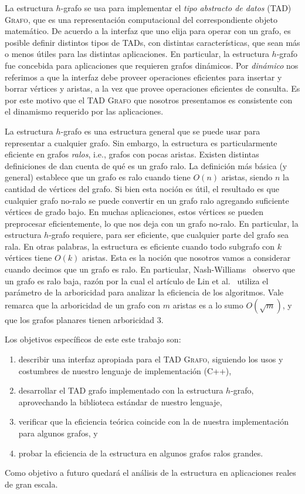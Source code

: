 \documentclass[%
    a4paper,%
    12pt,%
    twoside,%
    openright,%
    halfparskip,%
    cleardoubleempty,%
    bigheadings,%
    titlepage,%
    headsepline%
]{scrbook}
\newcommand{\Grafo}{\textsc{Grafo}\xspace}
\begin{document}
La estructura $h$-grafo se usa para implementar el \emph{tipo abstracto de datos} (TAD) \Grafo, que es una representación computacional del correspondiente objeto matemático.  De acuerdo a la interfaz que uno elija para operar con un grafo, es posible definir distintos tipos de TADs, con distintas características, que sean más o menos útiles para las distintas aplicaciones.  En particular, la estructura $h$-grafo fue concebida para aplicaciones que requieren grafos dinámicos.  Por \emph{dinámico} nos referimos a que la interfaz debe proveer operaciones eficientes para insertar y borrar vértices y aristas, a la vez que provee operaciones eficientes de consulta.  Es por este motivo que el TAD \Grafo que nosotros presentamos es consistente con el dinamismo requerido por las aplicaciones.  

La estructura $h$-grafo es una estructura general que se puede usar para representar a cualquier grafo.  Sin embargo, la estructura es particularmente eficiente en grafos \emph{ralos}, i.e., grafos con pocas aristas.  Existen distintas definiciones de dan cuenta de qué es un grafo ralo.  La definición más básica (y general) establece que un grafo es ralo cuando tiene $O(n)$ aristas, siendo $n$ la cantidad de vértices del grafo.  Si bien esta noción es útil, el resultado es que cualquier grafo no-ralo se puede convertir en un grafo ralo agregando suficiente vértices de grado bajo.  En muchas aplicaciones, estos vértices se pueden preprocesar eficientemente, lo que nos deja con un grafo no-ralo.  En particular, la estructura $h$-grafo requiere, para ser eficiente, que cualquier parte del grafo sea rala.  En otras palabras, la estructura es eficiente cuando todo subgrafo con $k$ vértices tiene $O(k)$ aristas.  Esta es la noción que nosotros vamos a considerar cuando decimos que un grafo es ralo.  En particular, Nash-Williams~\cite{Nash-WilliamsJLMS1964} observo que un grafo es ralo baja, razón por la cual el artículo de Lin et al.~\cite{LinSoulignacSzwarcfiterTCS2012} utiliza el parámetro de la arboricidad para analizar la eficiencia de los algoritmos.  Vale remarca que la arboricidad de un grafo con $m$ aristas es a lo sumo $O(\sqrt{m})$, y que los grafos planares tienen arboricidad $3$.  

Los objetivos específicos de este este trabajo son:
\begin{enumerate}
  \item describir una interfaz apropiada para el TAD \Grafo, siguiendo los usos y costumbres de nuestro lenguaje de implementación (C++),
  \item desarrollar el TAD grafo implementado con la estructura $h$-grafo, aprovechando la biblioteca estándar de nuestro lenguaje,
  \item verificar que la eficiencia teórica coincide con la de nuestra implementación para algunos grafos, y
  \item probar la eficiencia de la estructura en algunos grafos ralos grandes.
\end{enumerate}
Como objetivo a futuro quedará el análisis de la estructura en aplicaciones reales de gran escala.
\end{document}
